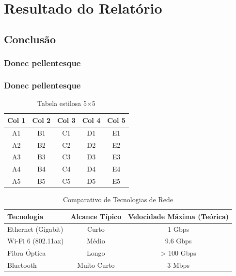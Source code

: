 \documentclass[12pt,a4paper,oneside]{memoir}
\begin{document}
\part{Resultado do Relatório}



\chapter{Conclusão}
\section{Donec pellentesque}
\lipsum[55]
\section{Donec pellentesque}
\lipsum[101]
\begin{table}[ht]
    \centering
    \caption{Tabela estilosa 5×5}
    \label{tab:estilosa}
    \begin{tabular}{ccccc}
        \toprule
        Col 1 & Col 2 & Col 3 & Col 4 & Col 5 \\
        \midrule
        A1 & B1 & C1 & D1 & E1 \\
        A2 & B2 & C2 & D2 & E2 \\
        A3 & B3 & C3 & D3 & E3 \\
        A4 & B4 & C4 & D4 & E4 \\
        A5 & B5 & C5 & D5 & E5 \\
        \bottomrule
    \end{tabular}
\end{table}
\begin{table}[ht]
    \centering
    \caption{Comparativo de Tecnologias de Rede}
    \label{tab:comp-redes}
    \begin{tabular}{lcc}
        \toprule
        Tecnologia & Alcance Típico & Velocidade Máxima (Teórica) \\
        \midrule
        Ethernet (Gigabit) & Curto & 1 Gbps \\
        Wi-Fi 6 (802.11ax) & Médio & 9.6 Gbps \\
        Fibra Óptica & Longo & > 100 Gbps \\
        Bluetooth & Muito Curto & 3 Mbps \\
        \bottomrule
    \end{tabular}
\end{table}
\end{document}
